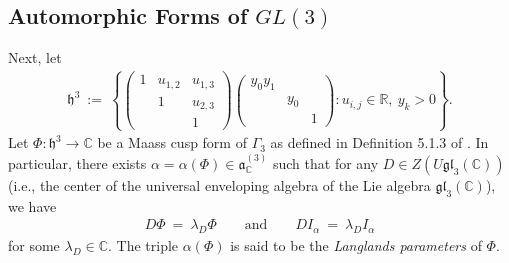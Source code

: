 \documentclass[11pt,reqno]{amsart}
\theoremstyle{definition}
\theoremstyle{definition}
\theoremstyle{remark}
\newcommand{\R}{\ensuremath{\mathbb{R}}}
\newcommand{\C}{\ensuremath{\mathbb{C}}}
\numberwithin{equation}{section}
\begin{document}
\subsection{Automorphic Forms of $GL(3)$}\label{autformgl3}


Next, let  
\begin{align*}
	\mathfrak{h}^{3} \ := \  \left\{  \begin{pmatrix}
		1 & u_{1,2} & u_{1,3} \\
		&     1      & u_{2,3} \\
		&             & 1
	\end{pmatrix} 
	\begin{pmatrix}
		y_{0}y_{1} &          &       \\
		& y_{0} &       \\
		&          &  1
	\end{pmatrix}: u_{i,j} \in \R, \ y_{k} >0 \right\}.  
	\end{align*}
 Let $\Phi: \mathfrak{h}^3 \rightarrow \C$ be a Maass cusp form of $\Gamma_{3}$ as defined in Definition 5.1.3 of \cite{Go15}. In particular,  there exists  $\alpha= \alpha(\Phi)\in \mathfrak{a}_{\C}^{(3)}$ such that  for any $D\in Z(U\mathfrak{gl}_{3}(\C))$  (i.e., the center of the universal enveloping algebra of the Lie algebra $\mathfrak{gl}_{3}(\C)$),  we have
\begin{align*}
D\Phi \ = \  \lambda_{D} \Phi \hspace{20pt} \text{ and } \hspace{20pt} 
DI_{\alpha} \ = \ \lambda_{D} I_{\alpha}
\end{align*}
for some $\lambda_{D}\in \C$. The triple $\alpha(\Phi)$ is said to be  the \textit{Langlands parameters} of $\Phi$. %
\end{document}
